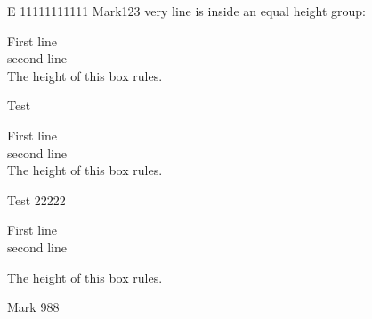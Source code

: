 E 11111111111 Mark123 very line is inside an equal height group:
\begin{tcbraster}[raster columns=2,raster equal height=rows,  raster valign=top,
title=Box \thetcbrasternum,
enhanced,size=small]
\begin{bxExample}[]First line\\second line\\
The height of this box rules.

\end{bxExample}
\begin{bxExample}Test
\end{bxExample}
\begin{bxExample}[]First line\\second line\\
The height of this box rules.

\end{bxExample}
\begin{bxExample}[use height from group, colback=white]Test 22222
\end{bxExample}
\begin{tcolorbox}[colback=white]
First line\\second line\end{tcolorbox}

\begin{tcolorbox}[colback=white]The height of this box rules.\end{tcolorbox}
\end{tcbraster}



\clearpage

Mark 988\\

